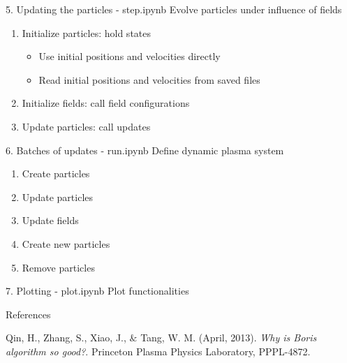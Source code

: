 \documentclass{beamer}
\begin{document}
	\begin{frame}[t]{5. Updating the particles - step.ipynb}
		Evolve particles under influence of fields
		\vspace{0.5cm}
		\begin{enumerate}
			\item Initialize particles: hold states \\
			\begin{itemize}
				\item Use initial positions and velocities directly
				\item Read initial positions and velocities from saved files
			\end{itemize}
			\item Initialize fields: call field configurations
			\item Update particles: call updates
		\end{enumerate}
	\end{frame}
	\begin{frame}
		
	\end{frame}
	\begin{frame}
		
	\end{frame}
	\begin{frame}
		
	\end{frame}

	\begin{frame}[t]{6. Batches of updates - run.ipynb}
		Define dynamic plasma system
		\vspace{0.5cm}
		\begin{enumerate}
			\item Create particles
			\item Update particles
			\item Update fields
			\item Create new particles
			\item Remove particles
		\end{enumerate}
	\end{frame}
	\begin{frame}
		
	\end{frame}
	\begin{frame}
		
	\end{frame}

	\begin{frame}[t]{7. Plotting - plot.ipynb}
		Plot functionalities
	\end{frame}

	\begin{frame}[t]{References}
	\begin{thebibliography}{}
		Qin, H., Zhang, S., Xiao, J., $\&$ Tang, W. M. (April, 2013). \textit{Why is Boris algorithm so good?}. Princeton Plasma Physics Laboratory, PPPL-4872.
		
	\end{thebibliography}
	\end{frame}
\end{document}
